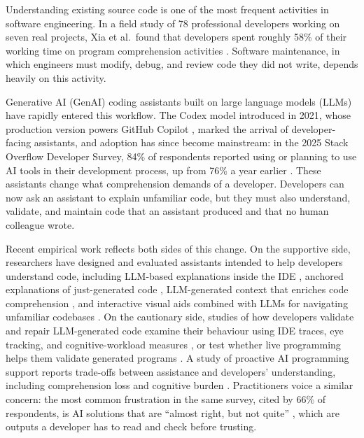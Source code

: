 \documentclass[conference]{IEEEtran}
\begin{document}
Understanding existing source code is one of the most frequent activities in software engineering. In a field study of 78 professional developers working on seven real projects, Xia et al.\ found that developers spent roughly 58\% of their working time on program comprehension activities \cite{xia2018}. Software maintenance, in which engineers must modify, debug, and review code they did not write, depends heavily on this activity.

Generative AI (GenAI) coding assistants built on large language models (LLMs) have rapidly entered this workflow. The Codex model introduced in 2021, whose production version powers GitHub Copilot \cite{chen2021}, marked the arrival of developer-facing assistants, and adoption has since become mainstream: in the 2025 Stack Overflow Developer Survey, 84\% of respondents reported using or planning to use AI tools in their development process, up from 76\% a year earlier \cite{so2025}. These assistants change what comprehension demands of a developer. Developers can now ask an assistant to explain unfamiliar code, but they must also understand, validate, and maintain code that an assistant produced and that no human colleague wrote.

Recent empirical work reflects both sides of this change. On the supportive side, researchers have designed and evaluated assistants intended to help developers understand code, including LLM-based explanations inside the IDE \cite{nam2024}, anchored explanations of just-generated code \cite{yan2024}, LLM-generated context that enriches code comprehension \cite{grandel2026}, and interactive visual aids combined with LLMs for navigating unfamiliar codebases \cite{kim2026}. On the cautionary side, studies of how developers validate and repair LLM-generated code examine their behaviour using IDE traces, eye tracking, and cognitive-workload measures \cite{tang2024}, or test whether live programming helps them validate generated programs \cite{ferdowsi2024}. A study of proactive AI programming support reports trade-offs between assistance and developers' understanding, including comprehension loss and cognitive burden \cite{pu2025}. Practitioners voice a similar concern: the most common frustration in the same survey, cited by 66\% of respondents, is AI solutions that are ``almost right, but not quite'' \cite{so2025}, which are outputs a developer has to read and check before trusting.
\end{document}
